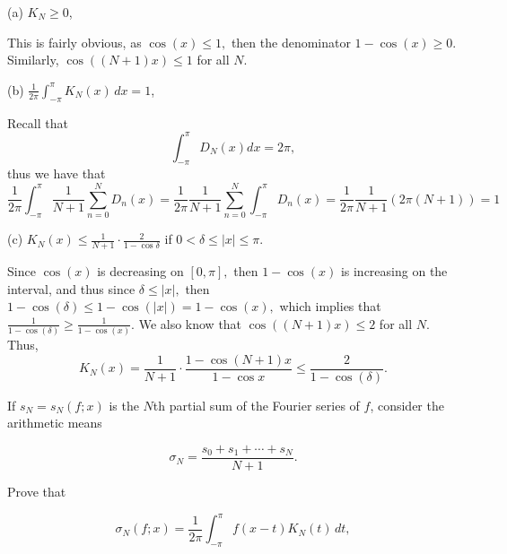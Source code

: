 \documentclass[11pt]{article}
\begin{document}
\begin{itemize}
\begin{problem}
    
    \item[(a)] \( K_N \geq 0 \),
    \end{problem}
    \begin{solution}
        This is fairly obvious, as $\cos(x) \leq 1,$ then the denominator $1-\cos(x)\geq 0.$ Similarly, $\cos((N+1)x)\leq 1$ for all $N.$ 
    \end{solution}
\begin{problem}
    
    \item[(b)] \( \frac{1}{2\pi} \int_{-\pi}^{\pi} K_N(x) \, dx = 1 \),
    \end{problem}
\begin{solution}
    Recall that 
    \[\int_{-\pi}^\pi D_N(x)dx = 2\pi,\] thus we have that
    \[\frac{1}{2\pi}\int_{-\pi}^\pi \frac{1}{N+1}\sum_{n=0}^ND_n(x) = \frac{1}{2\pi}\frac{1}{N+1}\sum_{n=0}^N\int_{-\pi}^\pi D_n(x) = \frac{1}{2\pi}\frac{1}{N+1}(2\pi(N+1)) = 1\]
\end{solution}
\begin{problem}
        \item[(c)] \( K_N(x) \leq \frac{1}{N+1} \cdot \frac{2}{1 - \cos \delta} \) if \( 0 < \delta \leq |x| \leq \pi \).
        \end{problem}
        \begin{solution}
            
Since $\cos(x)$ is decreasing on $[0,\pi],$ then $1-\cos(x)$ is increasing on the interval, and thus since $\delta \leq |x|,$ then $1-\cos(\delta)\leq 1-\cos(|x|) = 1-\cos(x),$ which implies that $\frac{1}{1-\cos(\delta)}\geq \frac{1}{1-\cos(x)}.$ We also know that $\cos((N+1)x)\leq 2$ for all $N.$ Thus, 
\[K_N(x) = \frac{1}{N+1} \cdot \frac{1 - \cos (N+1)x}{1 - \cos x} \leq \frac{2}{1-\cos(\delta)}.\]

        \end{solution}
\end{itemize}
If \( s_N = s_N(f; x) \) is the \( N \)th partial sum of the Fourier series of \( f \), consider the arithmetic means


\[ \sigma_N = \frac{s_0 + s_1 + \cdots + s_N}{N+1}. \]



Prove that


\[ \sigma_N(f; x) = \frac{1}{2\pi} \int_{-\pi}^{\pi} f(x - t) K_N(t) \, dt, \]
\end{document}
